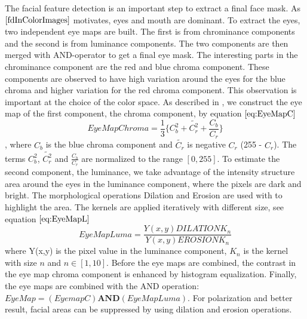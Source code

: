 

The facial feature detection is an important step to extract a final face mask. As $\cite{fdInColorImages}$ motivates, eyes and mouth are dominant. %
\newline
\indent To extract the eyes, two independent eye maps are built. The first is from chrominance components and the second is from luminance components. The two components are then merged with AND-operator to get a final eye mask. The interesting parts in the chrominance component are the red and blue chroma component. These components are observed to have high variation around the eyes for the blue chroma and higher variation for the red chroma component. This observation is important at the choice of the color space. As described in \cite{fdInColorImages}, we construct the eye map of the first component, the chroma component, by equation $\ref{eq:EyeMapC}$
\newline
\newline
\begin{equation} 
\label{eq:EyeMapC}
EyeMapChroma = \frac{1}{3} \lbrace C_b^2 + \tilde{C_r^2} + \frac{C_b}{C_r} \rbrace
\end{equation}
\newline
\newline
, where $C_b$ is the blue chroma component and $\tilde{C_r}$ is negative $C_r$ (255 - $C_r$). The terms $C_b^2$, $\tilde{C_r^2}$ and $\frac{C_b}{C_r}$ are normalized to the range $[0, 255]$.
\newline
\newline
To estimate the second component, the luminance, we take advantage of the intensity structure area around the eyes in the luminance component, where the pixels are dark and bright. The morphological operations Dilation and Erosion are used with to highlight the area.  The kernels are applied iteratively with different size, see equation $\ref{eq:EyeMapL}$
\newline
\newline
\begin{equation}
\label{eq:EyeMapL}
EyeMapLuma = \frac{Y(x,y) DILATION K_n}{Y(x,y) EROSION K_n}
\end{equation}
\newline
\newline
where Y(x,y) is the pixel value in the luminance component, $K_n$ is the kernel with size $n$ and $ n \in [1,10]$.
\newline
Before the eye maps are combined, the contrast in the eye map chroma component is enhanced by histogram equalization. Finally, the eye maps are combined with the AND operation: $EyeMap = (EyemapC) \textbf{AND} (EyeMapLuma)$. For polarization and better result, facial areas can be suppressed by using dilation and erosion operations.


